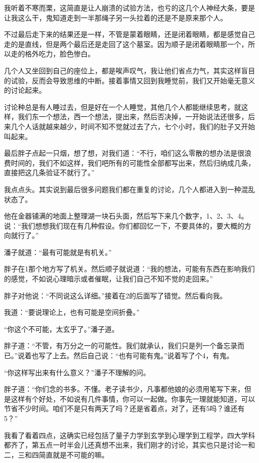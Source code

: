 我听着不寒而栗，这简直是让人崩溃的试验方法，也亏的这几个人神经大条，要是让我这么干，鬼知道走到一半那绳子另一头拉着的还是不是原来那个人。

不过最后走下来的结果还是一样，不管是蒙着眼睛，还是闭着眼睛，都是感觉自己走的是直线，但是两个最后还是走回了这个墓室。因为顺子是闭着眼睛那一个，所以走的格外吃力，脸色惨白。

几个人又坐回到自己的座位上，都是唉声叹气，我让他们省点力气，其实这样盲目的试验，反而会导致思维的中断。接着事情又回到我睡觉前，我们又开始毫无意义的讨论起来。

讨论种总是有人睡过去，但是好在一个人睡觉，其他几个人都能继续思考，就这样，我们东一个想法，西一个想法，提出来，然后否决掉，一开始说法还很多，后来几个人话就越来越少，时间不知不觉就过去了六，七个小时，我们的肚子又开始叫起来。

最后胖子点起一只烟，想了想，对我们道：“不行，咱们这么零散的想办法是很浪费时间的，我们不如这样，我们吧所有的可能性全部都写出来，然后归纳成几条，直接把这几条验证不就行了。”

我点点头。其实说到最后很多问题我们都在重复的讨论，几个人都进入到一种混乱状态了。

他在金器铺满的地面上整理湖一块石头面，然后写下来几个数字，1、2、3、4。说：“我们想想我们现在有几种假设。你们都回忆一下，不要具体的，要大概的方向就行了。”

潘子就道：“最有可能就是有机关。”

胖子在1那个地方写了机关。然后顺子就说道：“我的想法，可能有东西在影响我们的感觉，不如说心理暗示或者催眠，让我们自己不知不觉的走回来。”

胖子对他说：“不同说这么详细。”接着在2的后面写了错觉。然后看向我。

我道：“要说理论上，也有可能是空间折叠。”

“你这个不可能，太玄乎了。”潘子道。

胖子道：“不管，有万分之一的可能性。我们就承认，我们只是列一个备忘录而已。”说着也写了上去。然后自己说：“也有可能有鬼。”说着写了个4，有鬼。

“你这样写出来有什么意义？”潘子不理解的问。

胖子道：“你们念的书多。不懂。老子读书少，凡事都他娘的必须用笔写下来，但是这样有个好处，不如说有几件事情，你可以一起做。你事先一理就能知道，可以节省不少时间。咱们不是只有两天了吗？还是省着点，对了，还有5吗？谁还有5？”

我看了看着四点，这确实已经包括了量子力学到玄学到心理学到工程学，四大学科都齐了，第五点一时半会儿还真想不出来，我们刚才的讨论，其实也只是讨论一和二，三和四简直就是不可能的嘛。

